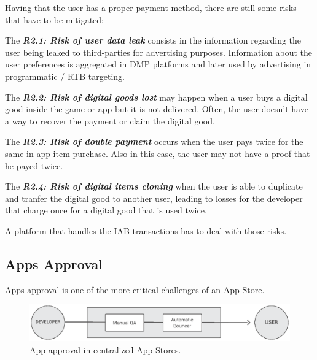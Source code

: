 
Having that the user has a proper payment method, there are still some risks that have to be mitigated:

\begin{tcolorbox}[enhanced jigsaw,sharp corners, drop fuzzy shadow=ShadowColor]

The {\bf\em R2.1: Risk of user data leak} consists in the information regarding the user being leaked to third-parties for advertising purposes. Information about the user preferences is aggregated in DMP platforms and later used by advertising in programmatic / RTB targeting.


The {\bf\em R2.2: Risk of digital goods lost} may happen when a user buys a digital good inside the game or app but it is not delivered. Often, the user doesn't have a way to recover the payment or claim the digital good.

The {\bf\em R2.3: Risk of double payment} occurs when the user pays twice for the same in-app item purchase. Also in this case, the user may not have a proof that he payed twice.

The {\bf\em R2.4: Risk of digital items cloning} when the user is able to duplicate and tranfer the digital good to another user, leading to losses for the developer that charge once for a digital good that is used twice.

\end{tcolorbox}

A platform that handles the IAB transactions has to deal with those risks.


\subsection{Apps Approval}


Apps approval is one of the more critical challenges of an App Store.

\begin{figure}[!ht]
\centering
\includegraphics[width=\textwidth]{diagrams/apps_approval_flow.eps}
\caption{App approval in centralized App Stores.}
\label{fig:app_approval_flow}
\end{figure}


